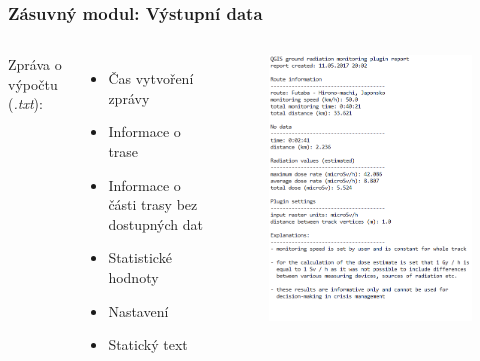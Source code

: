 \documentclass{beamer}
\begin{document}
\begin{frame}
\frametitle{Zásuvný modul: Výstupní data}
\begin{columns}

	Zpráva o výpočtu (\textit{.txt}):
	\begin{itemize}
		\item Čas vytvoření zprávy
		\item Informace o trase
		\item Informace o části trasy bez dostupných dat
		\item Statistické hodnoty
		\item Nastavení
		\item Statický text
	\end{itemize}
	\begin{figure}[H] \centering
		\includegraphics[scale=0.35]{./pictures/report.png}
	\end{figure}
\end{columns}


	
\end{frame}
\end{document}
